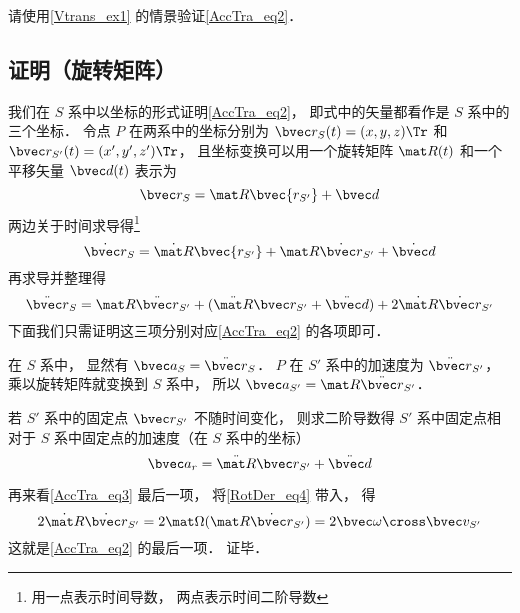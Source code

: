 \begin{exercise}{}
请使用\autoref{Vtrans_ex1} 的情景验证\autoref{AccTra_eq2}．
\end{exercise}

\subsection{证明（旋转矩阵）}
我们在 $S$ 系中以坐标的形式证明\autoref{AccTra_eq2}， 即式中的矢量都看作是 $S$ 系中的三个坐标． 令点 $P$ 在两系中的坐标分别为 $\bvec r_S(t) = (x, y, z)\Tr$ 和 $\bvec r_{S'}(t) = (x', y', z')\Tr$， 且坐标变换可以用一个旋转矩阵 $\mat R(t)$ 和一个平移矢量 $\bvec d(t)$ 表示为
\begin{equation}
\bvec r_S = \mat R \bvec{r_{S'}} + \bvec d
\end{equation}
两边关于时间求导得\footnote{用一点表示时间导数， 两点表示时间二阶导数}
\begin{equation}
\dot{\bvec r}_S = \dot{\mat R} \bvec{r_{S'}} + \mat R \dot{\bvec r}_{S'}+ \dot{\bvec d}
\end{equation}
再求导并整理得
\begin{equation}\label{AccTra_eq3}
\ddot{\bvec r}_S = \mat R \ddot{\bvec r}_{S'} + (\ddot{\mat R} \bvec r_{S'} + \ddot{\bvec d}) + 2 \dot{\mat R} \dot{\bvec r}_{S'}
\end{equation}
下面我们只需证明这三项分别对应\autoref{AccTra_eq2} 的各项即可．

在 $S$ 系中， 显然有 $\bvec a_S = \ddot{\bvec r}_S$． $P$ 在 $S'$ 系中的加速度为 $\ddot{\bvec r}_{S'}$， 乘以旋转矩阵就变换到 $S$ 系中， 所以 $\bvec a_{S'} = \mat R \ddot{\bvec r}_{S'}$．

若 $S'$ 系中的固定点 $\bvec r_{S'}$ 不随时间变化， 则求二阶导数得 $S'$ 系中固定点相对于 $S$ 系中固定点的加速度（在 $S$ 系中的坐标）
\begin{equation}
\bvec a_r = \ddot{\mat R} \bvec r_{S'} + \ddot{\bvec d}
\end{equation}

再来看\autoref{AccTra_eq3} 最后一项， 将\autoref{RotDer_eq4} 带入， 得
\begin{equation}
2\dot{\mat R} \dot{\bvec r}_{S'} = 2\mat\Omega (\mat R \dot{\bvec r}_{S'}) = 2\bvec \omega \cross \bvec v_{S'}
\end{equation}
这就是\autoref{AccTra_eq2} 的最后一项． 证毕．
